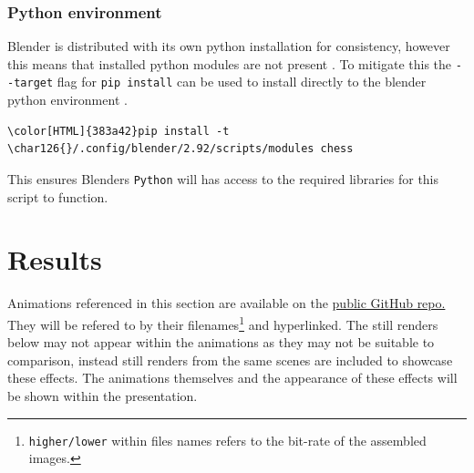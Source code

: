 \documentclass[11pt]{article}
\begin{document}
\subsubsection{Python environment}
\label{sec:org4ac9b25}
Blender is distributed with its own python installation for consistency, however
this means that installed python modules are not present
\cite{blender-python-env}. To mitigate this the \texttt{-{}-target} flag for \texttt{pip install}
can be used to install directly to the blender python environment
\cite{pip-install-man}.
\begin{Code}
\begin{Verbatim}[]
\color[HTML]{383a42}pip install -t \char126{}/.config/blender/2.92/scripts/modules chess
\end{Verbatim}
\end{Code}
This ensures Blenders \texttt{Python} will has access to the required libraries for this
script to function.

\section{Results}
\label{sec:org6ce5094}
Animations referenced in this section are available on the \href{https://github.com/Jake-Moss/blender-chess/tree/master/Videos}{public GitHub repo.}
They will be refered to by their filenames\footnote{\texttt{higher/lower} within files names refers to the bit-rate of the assembled images.} and hyperlinked. The still
renders below may not appear within the animations as they may not be suitable
to comparison, instead still renders from the same scenes are included to
showcase these effects. The animations themselves and the appearance of these
effects will be shown within the presentation.
\end{document}
